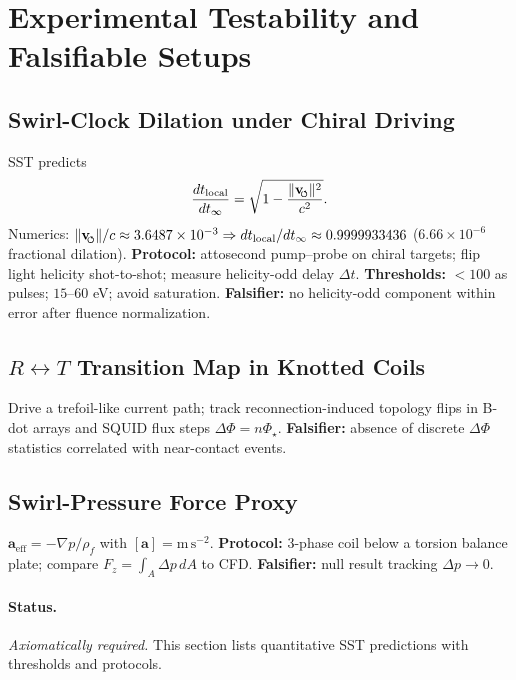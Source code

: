 \documentclass[10pt,reprint,aps,onecolumn,nofootinbib]{revtex4-2}
\newcommand{\vswirl}{\mathbf{v}_{\!\mkern-2mu\scriptscriptstyle\boldsymbol{\circlearrowleft}}}
\newcommand{\rhof}{\rho_{\!f}}                           %
\newcommand{\rhoF}{\rhof}
\newcommand{\rc}{r_c}                                    %
\begin{document}

    \section{Experimental Testability and Falsifiable Setups}
    \label{sec:SST-falsifiability}

    \subsection{Swirl-Clock Dilation under Chiral Driving}
        SST predicts
        \[
            \frac{dt_{\text{local}}}{dt_\infty}=\sqrt{1-\frac{\lVert\vswirl\rVert^2}{c^2}}.
        \]
        Numerics: \(\lVert\vswirl\rVert/c\approx 3.6487\times10^{-3}\Rightarrow dt_{\text{local}}/dt_\infty\approx 0.9999933436\)
        (\(6.66\times10^{-6}\) fractional dilation).
        \textbf{Protocol:} attosecond pump–probe on chiral targets; flip light helicity shot-to-shot; measure helicity-odd delay \(\Delta t\).
        \textbf{Thresholds:} \(<100\) as pulses; \(15\text{–}60\) eV; avoid saturation. \textbf{Falsifier:} no helicity-odd component within error after fluence normalization.

    \subsection{\(R\leftrightarrow T\) Transition Map in Knotted Coils}
        Drive a trefoil-like current path; track reconnection-induced topology flips in B-dot arrays and SQUID flux steps \(\Delta\Phi=n\Phi_\star\).
        \textbf{Falsifier:} absence of discrete \(\Delta\Phi\) statistics correlated with near-contact events.

    \subsection{Swirl-Pressure Force Proxy}
        \(\mathbf{a}_{\text{eff}}=-\nabla p/\rhoF\) with \([\mathbf{a}]=\mathrm{m\,s^{-2}}\).
        \textbf{Protocol:} 3-phase coil below a torsion balance plate; compare \(F_z=\int_A \Delta p\,dA\) to CFD. \textbf{Falsifier:} null result tracking \(\Delta p\to 0\).



        \paragraph{Status.} \emph{Axiomatically required.} This section lists quantitative SST predictions with thresholds and protocols.
\end{document}
